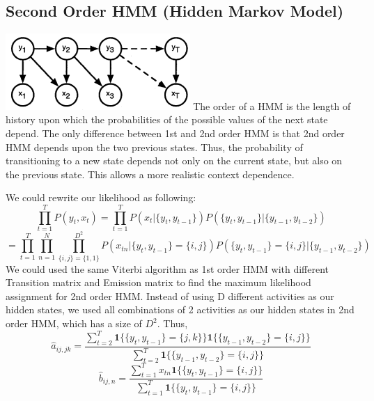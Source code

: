 \documentclass[10pt,letter]{article}
\numberwithin{equation}{section} %
\numberwithin{figure}{section} %
\numberwithin{table}{section} %
\begin{document}
\subsection{Second Order HMM (Hidden Markov Model)}\includegraphics[width=7cm]{2hmm}
The order of a HMM is the length of history upon which the probabilities of the possible values of the next state depend. The only difference between 1st and 2nd order HMM is that 2nd order HMM depends upon the two previous states. Thus, the probability of transitioning to a new state depends not only on the current state, but also on the previous state. This allows a more realistic context dependence.

We could rewrite our likelihood as following:
$$ \prod_{t=1}^{T} P(y_t, x_t) = \prod_{t=1}^T P(x_t|\{y_t, y_{t-1}\})P(\{y_t,y_{t-1}\}|\{y_{t-1},y_{t-2}\})$$
$$=\prod_{t=1}^T\prod_{n=1}^N\prod_{\{i,j\}=\{1,1\}}^{D^2} P(x_{tn}|\{y_t, y_{t-1}\} = \{i,j\})P(\{y_t, y_{t-1}\} = \{i,j\}|\{y_{t-1}, y_{t-2}\}) $$
We could used the same Viterbi algorithm as 1st order HMM with different Transition matrix and Emission matrix to find the maximum likelihood assignment for 2nd order HMM. 
Instead of using D different activities as our hidden states, we used all combinations of 2 activities as our hidden states in 2nd order HMM, which has a size of $D^2$. Thus,
$$\hat{a}_{ij, jk} = \frac{\sum_{t=2}^T \mathbf{1}\{\{y_t,y_{t-1}\}=\{j,k\}\}\mathbf{1}\{\{y_{t-1},y_{t-2}\}=\{i,j\}\}}{\sum_{t=2}^T \mathbf{1}\{\{y_{t-1},y_{t-2}\}=\{i,j\}\}}$$
$$\hat{b}_{ij,n} = \frac{\sum_{t=1}^T x_{tn}\mathbf{1}\{\{y_t,y_{t-1}\}=\{i, j\}\}}{\sum_{t=1}^T \mathbf{1}\{\{y_t,y_{t-1}\}=\{i, j\}\}}$$
\end{document}
